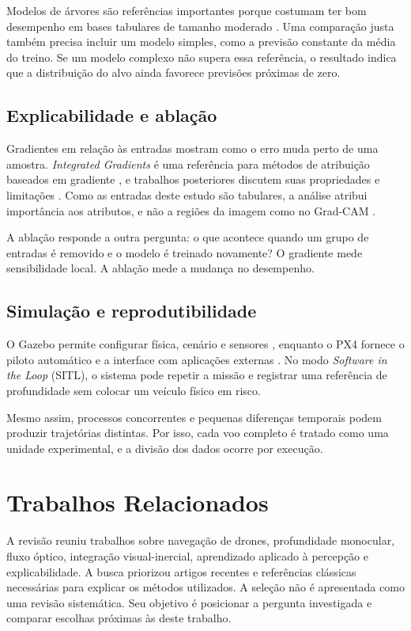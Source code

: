 Modelos de árvores são referências importantes porque costumam ter bom desempenho em bases tabulares de tamanho moderado \cite{OyallonandGaelVaroquaux5220}. Uma comparação justa também precisa incluir um modelo simples, como a previsão constante da média do treino. Se um modelo complexo não supera essa referência, o resultado indica que a distribuição do alvo ainda favorece previsões próximas de zero.

\section{Explicabilidade e ablação}

Gradientes em relação às entradas mostram como o erro muda perto de uma amostra. \emph{Integrated Gradients} é uma referência para métodos de atribuição baseados em gradiente \cite{Sundararajan2017}, e trabalhos posteriores discutem suas propriedades e limitações \cite{Walker5289,Axiomatic2025}. Como as entradas deste estudo são tabulares, a análise atribui importância aos atributos, e não a regiões da imagem como no Grad-CAM \cite{Selvaraju2017}.

A ablação responde a outra pergunta: o que acontece quando um grupo de entradas é removido e o modelo é treinado novamente? O gradiente mede sensibilidade local. A ablação mede a mudança no desempenho.

\section{Simulação e reprodutibilidade}

O Gazebo permite configurar física, cenário e sensores \cite{Koenig7803}, enquanto o PX4 fornece o piloto automático e a interface com aplicações externas \cite{Meier8092}. No modo \textit{Software in the Loop} (SITL), o sistema pode repetir a missão e registrar uma referência de profundidade sem colocar um veículo físico em risco.

Mesmo assim, processos concorrentes e pequenas diferenças temporais podem produzir trajetórias distintas. Por isso, cada voo completo é tratado como uma unidade experimental, e a divisão dos dados ocorre por execução.

\chapter{Trabalhos Relacionados}\label{cap:relacionados}

A revisão reuniu trabalhos sobre navegação de drones, profundidade monocular, fluxo óptico, integração visual-inercial, aprendizado aplicado à percepção e explicabilidade. A busca priorizou artigos recentes e referências clássicas necessárias para explicar os métodos utilizados. A seleção não é apresentada como uma revisão sistemática. Seu objetivo é posicionar a pergunta investigada e comparar escolhas próximas às deste trabalho.

